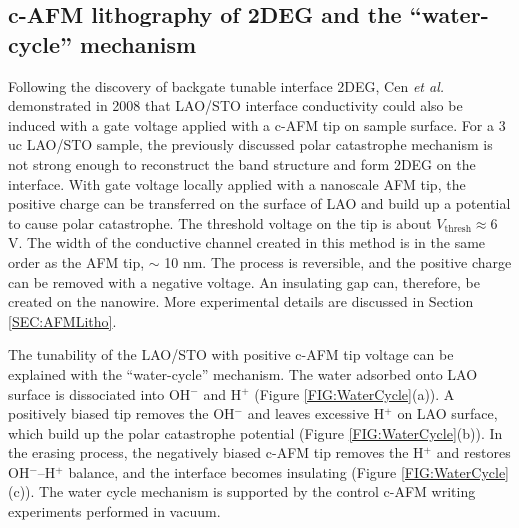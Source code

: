\documentclass[pdflatex, sectionletters, 12pt]{pittetd}    %
\begin{document}
\subsection{c-AFM lithography of 2DEG and the ``water-cycle'' mechanism}
\label{SEC:WaterCycle}

Following the discovery of backgate tunable interface 2DEG, Cen \textit{et al.}  demonstrated in 2008 that LAO/STO interface conductivity could also be induced with a gate voltage applied with a c-AFM tip on sample surface\cite{cen2008nanoscale}. For a 3 uc LAO/STO sample, the previously discussed polar catastrophe mechanism is not strong enough to reconstruct the band structure and form 2DEG on the interface. With gate voltage locally applied with a nanoscale AFM tip, the positive charge can be transferred on the surface of LAO and build up a potential to cause polar catastrophe. The threshold voltage on the tip is about $V_\mathrm{thresh} \approx 6$ V\cite{cen2008nanoscale}. The width of the conductive channel created in this method is in the same order as the AFM tip, $\sim$ 10 nm. The process is reversible, and the positive charge can be removed with a negative voltage. An insulating gap can, therefore, be created on the nanowire. More experimental details are discussed in Section \ref{SEC:AFMLitho}.

The tunability of the LAO/STO with positive c-AFM tip voltage can be explained with the ``water-cycle'' mechanism\cite{bi2010water}. The water adsorbed onto LAO surface is dissociated into OH$^{-}$ and H$^{+}$ (Figure \ref{FIG:WaterCycle}(a)). A positively biased tip removes the OH$^{-}$ and leaves excessive H$^{+}$ on LAO surface, which build up the polar catastrophe potential (Figure \ref{FIG:WaterCycle}(b)). In the erasing process, the negatively biased c-AFM tip removes the H$^{+}$ and restores OH$^{-}$--H$^{+}$ balance, and the interface becomes insulating (Figure \ref{FIG:WaterCycle}(c)). The water cycle mechanism is supported by the control c-AFM writing experiments performed in vacuum\cite{bi2010water}.
\end{document}

